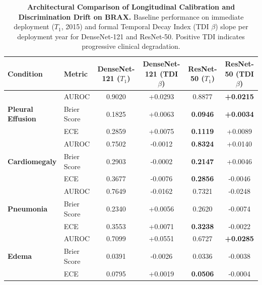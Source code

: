 \begin{table}[t]
\centering
\caption{\textbf{Architectural Comparison of Longitudinal Calibration and Discrimination Drift on BRAX.} Baseline performance on immediate deployment ($T_1$, 2015) and formal Temporal Decay Index (TDI $\beta$) slope per deployment year for DenseNet-121 and ResNet-50. Positive TDI indicates progressive clinical degradation.}
\label{tab:tdi_comparison}
\small
\begin{tabular}{llcccc}
\toprule
\textbf{Condition} & \textbf{Metric} & \textbf{DenseNet-121 ($T_1$)} & \textbf{DenseNet-121 (TDI $\beta$)} & \textbf{ResNet-50 ($T_1$)} & \textbf{ResNet-50 (TDI $\beta$)} \\
\midrule
\multirow{3}{*}{\textbf{Pleural Effusion}} 
 & AUROC & 0.9020 & +0.0293 & 0.8877 & \textbf{+0.0215} \\
 & Brier Score & 0.1825 & +0.0063 & \textbf{0.0946} & \textbf{+0.0034} \\
 & ECE & 0.2859 & +0.0075 & \textbf{0.1119} & +0.0089 \\
\midrule
\multirow{3}{*}{\textbf{Cardiomegaly}} 
 & AUROC & 0.7502 & -0.0012 & \textbf{0.8324} & +0.0140 \\
 & Brier Score & 0.2903 & -0.0002 & \textbf{0.2147} & +0.0046 \\
 & ECE & 0.3677 & -0.0076 & \textbf{0.2856} & -0.0046 \\
\midrule
\multirow{3}{*}{\textbf{Pneumonia}} 
 & AUROC & 0.7649 & -0.0162 & 0.7321 & -0.0248 \\
 & Brier Score & 0.2340 & +0.0056 & 0.2620 & -0.0074 \\
 & ECE & 0.3553 & +0.0071 & \textbf{0.3238} & -0.0022 \\
\midrule
\multirow{3}{*}{\textbf{Edema}} 
 & AUROC & 0.7099 & +0.0551 & 0.6727 & \textbf{+0.0285} \\
 & Brier Score & 0.0391 & -0.0026 & 0.0336 & -0.0038 \\
 & ECE & 0.0795 & +0.0019 & \textbf{0.0506} & -0.0004 \\
\bottomrule
\end{tabular}
\end{table}
